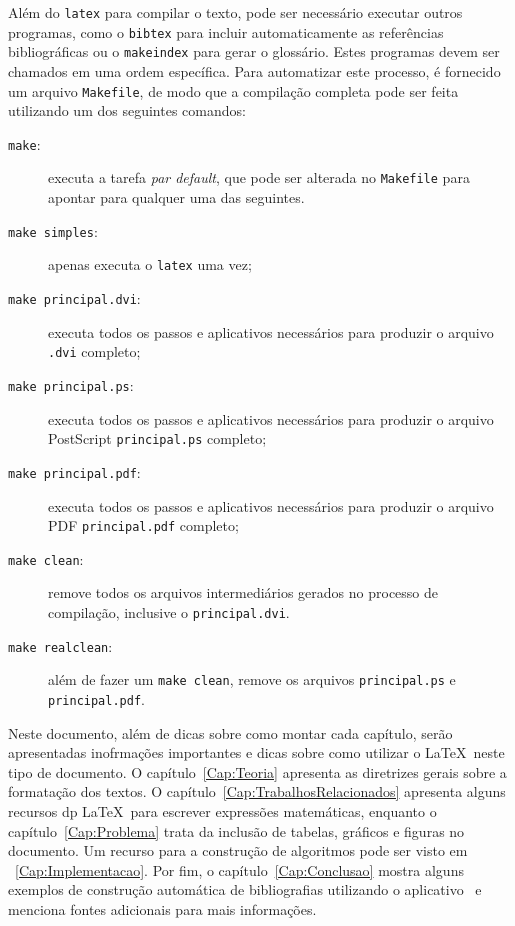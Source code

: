 Além do \texttt{latex} para compilar o texto, pode ser necessário
executar outros programas, como o \texttt{bibtex} para incluir
automaticamente as referências bibliográficas ou o \texttt{makeindex}
para gerar o glossário. Estes programas devem ser chamados em uma
ordem específica. Para automatizar este processo, é fornecido um
arquivo \texttt{Makefile}, de modo que a compilação completa pode
ser feita utilizando um dos seguintes comandos:%
%
\begin{description}
\item[{\tt make}:] executa a tarefa \emph{par default}, que pode ser
alterada no \texttt{Makefile} para apontar para qualquer uma das seguintes.
\item[{\tt make simples}:] apenas executa o \texttt{latex} uma vez;
\item[{\tt make principal.dvi}:] executa todos os passos e aplicativos
necessários para produzir o arquivo \texttt{.dvi} completo;
\item[{\tt make principal.ps}:] executa todos os passos e aplicativos
necessários para produzir o arquivo PostScript \texttt{principal.ps}
completo;
\item[{\tt make principal.pdf}:] executa todos os passos e aplicativos
necessários para produzir o arquivo PDF \texttt{principal.pdf} completo;
\item[{\tt make clean}:] remove todos os arquivos intermediários gerados
no processo de compilação, inclusive o \texttt{principal.dvi}.
\item[{\tt make realclean}:] além de fazer um \texttt{make clean}, remove
os arquivos \texttt{principal.ps} e \texttt{principal.pdf}.
\end{description}

%

Neste documento, além de dicas sobre como montar cada capítulo, serão apresentadas inofrmações importantes e dicas sobre como utilizar o \LaTeX\ neste tipo de documento. O capítulo~\ref{Cap:Teoria} apresenta as diretrizes gerais sobre a formatação dos textos. O capítulo~\ref{Cap:TrabalhosRelacionados} apresenta alguns recursos dp \LaTeX\ para escrever expressões
matemáticas, enquanto o capítulo~\ref{Cap:Problema} trata da inclusão de tabelas, gráficos e figuras no documento. Um recurso para a construção de algoritmos pode ser visto em ~\ref{Cap:Implementacao}. Por fim, o capítulo~\ref{Cap:Conclusao} mostra alguns exemplos de construção automática de bibliografias utilizando o aplicativo \BibTeX\ e menciona fontes adicionais para mais informações.


